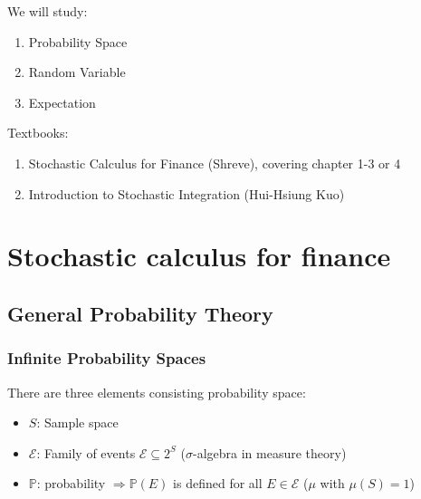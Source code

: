 \documentclass[12pt]{report}
\renewcommand{\1}{\mathbb{1}}
\renewcommand{\subset}{\subseteq}
\newcommand{\RNum}[1]{\uppercase\expandafter{\romannumeral #1\relax}}
\theoremstyle{break}
\theoremstyle{newdef}
\theoremstyle{remark}
\begin{document}
We will study:
\begin{enumerate}
\item Probability Space
\item Random Variable
\item Expectation
\end{enumerate}

Textbooks:
\begin{enumerate}
\item Stochastic Calculus for Finance \RNum{2} (Shreve), covering chapter 1-3 or 4
\item Introduction to Stochastic Integration (Hui-Hsiung Kuo)
\end{enumerate}


\part{Stochastic calculus for finance}


\chapter{General Probability Theory}
\section{Infinite Probability Spaces}
There are three elements consisting probability space:
\begin{itemize}
\item $S$: Sample space
\item $\mathcal{E}$: Family of events $\mathcal{E} \subset 2^S$ ($\sigma$-algebra in measure theory)
\item $\mathbb{P}$: probability $\Rightarrow \mathbb{P}(E)$ is defined for all $E \in \mathcal{E}$ ($\mu$ with $\mu(S)=1$)
\end{itemize}
\end{document}
